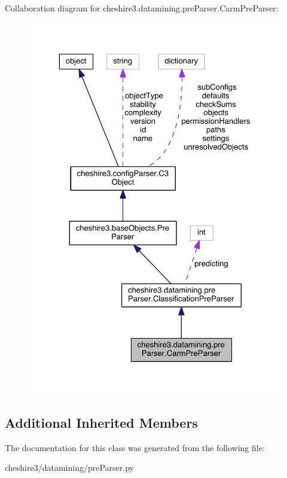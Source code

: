 Collaboration diagram for cheshire3.\-datamining.\-pre\-Parser.\-Carm\-Pre\-Parser\-:
\nopagebreak
\begin{figure}[H]
\begin{center}
\leavevmode
\includegraphics[width=325pt]{classcheshire3_1_1datamining_1_1pre_parser_1_1_carm_pre_parser__coll__graph}
\end{center}
\end{figure}
\subsection*{Additional Inherited Members}


The documentation for this class was generated from the following file\-:\begin{DoxyCompactItemize}
\item 
cheshire3/datamining/pre\-Parser.\-py\end{DoxyCompactItemize}
